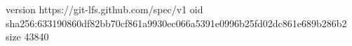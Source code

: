 version https://git-lfs.github.com/spec/v1
oid sha256:633190860df82bb70cf861a9930ec066a5391e0996b25fd02dc861e689b286b2
size 43840
